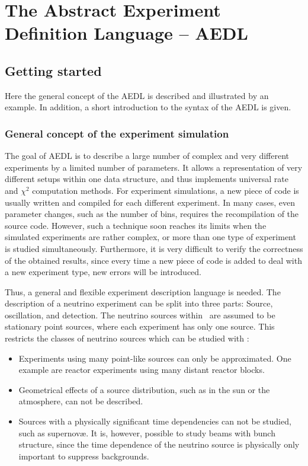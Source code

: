 
\part{The Abstract Experiment Definition Language -- AEDL}

\chapter{Getting started}

Here the general concept of the AEDL is described and illustrated by an example. In addition, a short introduction to the syntax of the AEDL is given.

\section{General concept of the experiment simulation}

The goal of AEDL is to describe a large number of complex and very 
different experiments by a limited number of parameters. It allows a
representation of very different setups within one data structure, and thus implements universal rate and $\chi^2$ computation methods. For experiment simulations, a new piece of code is usually written and compiled
for each different experiment. In many cases, even parameter changes, such as
the number of bins, requires the recompilation of the source code. 
However, such a technique soon reaches its limits when the simulated experiments are rather complex, or more than one type of experiment is studied simultaneously. Furthermore, it is very difficult to verify the correctness of the obtained results, since every time a new piece of code is added to 
deal with a new experiment type, new errors will be introduced.

Thus, a general and flexible experiment description language is needed.  
The description of a neutrino experiment can be split into three parts: Source, oscillation, and detection. The neutrino sources within \GLOBES\ 
are assumed to be stationary point sources, where each experiment has only 
one source. This restricts the classes of neutrino sources which can be studied with \GLOBES :
\begin{itemize}
\item
 Experiments using many point-like sources can only be approximated. One example are reactor experiments using many distant reactor blocks.
\item
 Geometrical effects of a source distribution, such as in the sun or the atmosphere, can not be described.
\item
 Sources with a physically significant time dependencies  can not be studied, such as  supernov\ae. It is, however, possible
to study beams with bunch structure, since the time dependence of the
neutrino source is physically only important to suppress backgrounds. 
\end{itemize}

